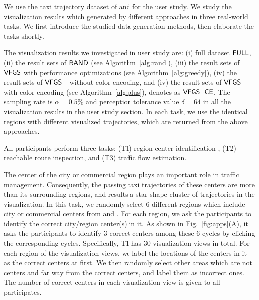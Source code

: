 We use the taxi trajectory dataset of \pt{} and \sz{} for the user study.
We study the visualization results which generated by different approaches in three real-world tasks.
We first introduce the studied data generation methods, then elaborate the tasks shortly.

The visualization results we investigated in user study are: (i) full dataset $\mathsf{FULL}$,
(ii) the result sets of $\mathsf{RAND}$ (see Algorithm~\ref{alg:rand}),
(iii) the result sets of $\mathsf{VFGS}$ with performance optimizations (see Algorithm~\ref{alg:greedy}),
(iv) the result sets of $\mathsf{VFGS}^{+}$ without color encoding,
and (iv) the result sets of $\mathsf{VFGS}^{+}$ with color encoding (see Algorithm~\ref{alg:plus}), denotes as $\mathsf{VFGS}^{+}\mathsf{CE}$.
The sampling rate is $\alpha = 0.5\%$ and perception tolerance value $\delta = 64$ in all the visualization results in the user study section.
In each task, we use the identical regions with different visualized trajectories, which are returned from the above approaches.


All participants perform three tasks:  (T1) region center identification , (T2) reachable route inspection, and (T3) traffic flow estimation.

The center of the city or commercial region plays an important role in traffic management.
Consequently, the passing taxi trajectories of these centers are more than its surrounding regions, and results a star-shape cluster of trajectories in the visualization.
In this task, we randomly select 6 different regions which include city or commercial centers from \pt{} and \sz{}.
For each region, we ask the participants to identify the correct city/region center(s) in it.
As shown in Fig.~\ref{fig:apps}(A), it asks the participants to identify 3 correct centers among these 6 cycles by clicking the corresponding cycles.
Specifically, T1 has 30 visualization views in total.
For each region of the visualization views,  we label the locations of the centers in it as the correct centers at first.
We then randomly select other areas which are not centers and far way from the correct centers, and label them as incorrect ones.
The number of correct centers in each visualization view is given to all participates.




